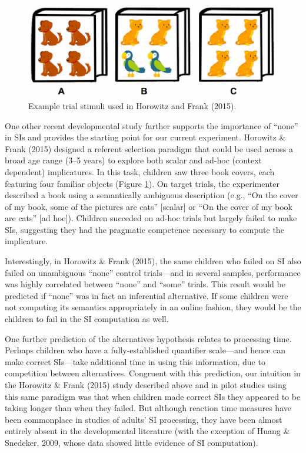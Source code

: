 \documentclass[10pt, letterpaper]{article}
\newenvironment{CodeChunk}{}{}
\begin{document}
\begin{CodeChunk}
\begin{figure}[b]

{\centering \includegraphics{figs/image-1} 

}

\caption[Example trial stimuli used in Horowitz and Frank (2015)]{Example trial stimuli used in Horowitz and Frank (2015).}\label{fig:image}
\end{figure}
\end{CodeChunk}

One other recent developmental study further supports the importance of
``none'' in SIs and provides the starting point for our current
experiment. Horowitz \& Frank (2015) designed a referent selection
paradigm that could be used across a broad age range (3--5 years) to
explore both scalar and ad-hoc (context dependent) implicatures. In this
task, children saw three book covers, each featuring four familiar
objects (Figure \ref{fig:image}). On target trials, the experimenter
described a book using a semantically ambiguous description (e.g., ``On
the cover of my book, some of the pictures are cats'' {[}scalar{]} or
``On the cover of my book are cats'' {[}ad hoc{]}). Children succeded on
ad-hoc trials but largely failed to make SIs, suggesting they had the
pragmatic competence necessary to compute the implicature.

Interestingly, in Horowitz \& Frank (2015), the same children who failed
on SI also failed on unambiguous ``none'' control trials---and in
several samples, performance was highly correlated between ``none'' and
``some'' trials. This result would be predicted if ``none'' was in fact
an inferential alternative. If some children were not computing its
semantics appropriately in an online fashion, they would be the children
to fail in the SI computation as well.

One further prediction of the alternatives hypothesis relates to
processing time. Perhaps children who have a fully-established
quantifier scale---and hence can make correct SIs---take additional time
in using this information, due to competition between alternatives.
Congruent with this prediction, our intuition in the Horowitz \& Frank
(2015) study described above and in pilot studies using this same
paradigm was that when children made correct SIs they appeared to be
taking longer than when they failed. But although reaction time measures
have been commonplace in studies of adults' SI processing, they have
been almost entirely absent in the developmental literature (with the
exception of Huang \& Snedeker, 2009, whose data showed little evidence
of SI computation).
\end{document}
